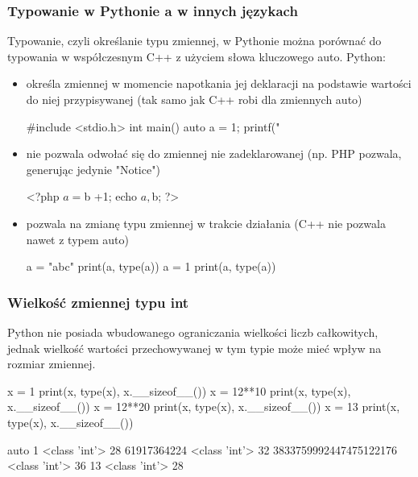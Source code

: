 \subsubsection{Typowanie w Pythonie a w innych językach \zaawansowane{***}}

Typowanie, czyli określanie typu zmiennej, w Pythonie można porównać do typowania w współczesnym C++ z użyciem słowa kluczowego auto. Python:

\begin{itemize}
\item określa zmiennej w momencie napotkania jej deklaracji na podstawie wartości do niej przypisywanej (tak samo jak C++ robi dla zmiennych auto)
\begin{CodeFrame*}[cpp]{}
#include <stdio.h>
int main() {
  auto a = 1;
  printf("%
}
\end{CodeFrame*}
\item nie pozwala odwołać się do zmiennej nie zadeklarowanej (np. PHP pozwala, generując jedynie "Notice")
\begin{CodeFrame*}[php]{}
<?php
$a = $b +1;
echo $a, $b;
?>
\end{CodeFrame*}
\item pozwala na zmianę typu zmiennej w trakcie działania (C++ nie pozwala nawet z typem auto)
\begin{CodeFrame*}[python]{}
a = "abc"
print(a, type(a))
a = 1
print(a, type(a))
\end{CodeFrame*}
\end{itemize}

\subsubsection{Wielkość zmiennej typu int \zaawansowane{***}}

Python nie posiada wbudowanego ograniczania wielkości liczb całkowitych, jednak wielkość wartości przechowywanej w tym typie może mieć wpływ na rozmiar zmiennej.

\begin{CodeFrame}[python]{0.45\textwidth}
x = 1
print(x, type(x), x.__sizeof__())
x = 12**10
print(x, type(x), x.__sizeof__())
x = 12**20
print(x, type(x), x.__sizeof__())
x = 13
print(x, type(x), x.__sizeof__())
\end{CodeFrame}
\begin{CodeFrame}{auto}
1 <class 'int'> 28
61917364224 <class 'int'> 32
3833759992447475122176 <class 'int'> 36
13 <class 'int'> 28
\end{CodeFrame}
